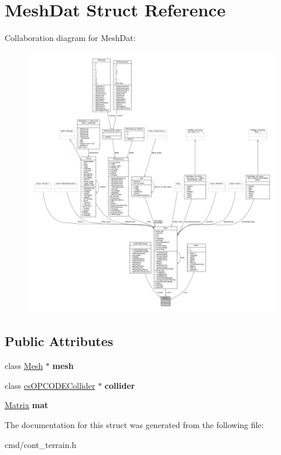 \hypertarget{structMeshDat}{}\section{Mesh\+Dat Struct Reference}
\label{structMeshDat}


Collaboration diagram for Mesh\+Dat\+:
\nopagebreak
\begin{figure}[H]
\begin{center}
\leavevmode
\includegraphics[width=350pt]{d3/d88/structMeshDat__coll__graph}
\end{center}
\end{figure}
\subsection*{Public Attributes}
\begin{DoxyCompactItemize}
\item 
class \hyperlink{classMesh}{Mesh} $\ast$ {\bfseries mesh}\hypertarget{structMeshDat_a6c4cb4156cf28281713e11bd1527c9da}{}\label{structMeshDat_a6c4cb4156cf28281713e11bd1527c9da}

\item 
class \hyperlink{classcsOPCODECollider}{cs\+O\+P\+C\+O\+D\+E\+Collider} $\ast$ {\bfseries collider}\hypertarget{structMeshDat_ab676dbf27730419371456ccd40f0bc5b}{}\label{structMeshDat_ab676dbf27730419371456ccd40f0bc5b}

\item 
\hyperlink{classMatrix}{Matrix} {\bfseries mat}\hypertarget{structMeshDat_aa43823da7cc7b74bd9dc330ebfffecac}{}\label{structMeshDat_aa43823da7cc7b74bd9dc330ebfffecac}

\end{DoxyCompactItemize}


The documentation for this struct was generated from the following file\+:\begin{DoxyCompactItemize}
\item 
cmd/cont\+\_\+terrain.\+h\end{DoxyCompactItemize}
